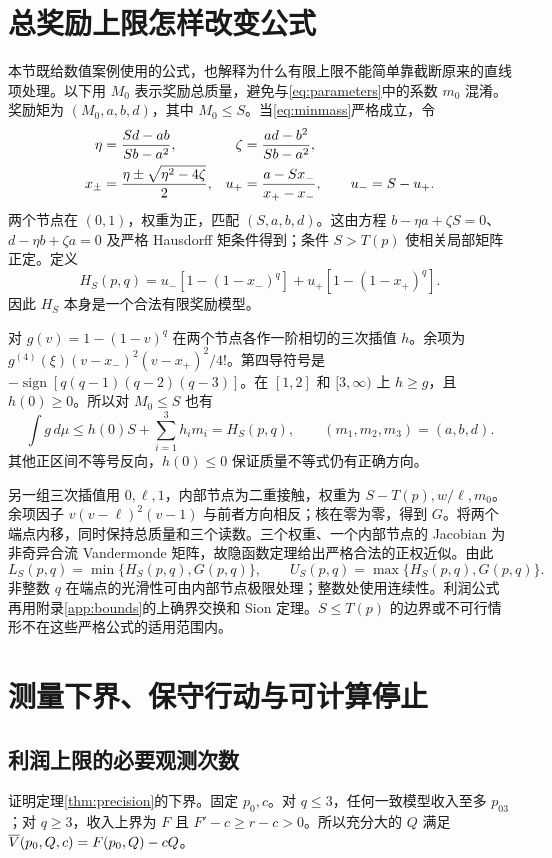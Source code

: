 \section{总奖励上限怎样改变公式}\label{app:cap}
本节既给数值案例使用的公式，也解释为什么有限上限不能简单靠截断原来的直线项处理。以下用 $M_0$ 表示奖励总质量，避免与\eqref{eq:parameters}中的系数 $m_0$ 混淆。奖励矩为 $(M_0,a,b,d)$，其中 $M_0\leq S$。当\eqref{eq:minmass}严格成立，令
\begin{align}
 \eta&=\frac{Sd-ab}{Sb-a^2},&\zeta&=\frac{ad-b^2}{Sb-a^2},\notag\\
 x_\pm&=\frac{\eta\pm\sqrt{\eta^2-4\zeta}}2,&
 u_+&=\frac{a-Sx_-}{x_+-x_-},\qquad u_-=S-u_+.\label{eq:capnodes}
\end{align}
两个节点在 $(0,1)$，权重为正，匹配 $(S,a,b,d)$。这由方程
$b-\eta a+\zeta S=0$、$d-\eta b+\zeta a=0$ 及严格 Hausdorff 矩条件得到；条件 $S>T(p)$ 使相关局部矩阵正定。定义
\begin{equation}\label{eq:HS}
 H_S(p,q)=u_-[1-(1-x_-)^q]+u_+[1-(1-x_+)^q].
\end{equation}
因此 $H_S$ 本身是一个合法有限奖励模型。

对 $g(v)=1-(1-v)^q$ 在两个节点各作一阶相切的三次插值 $h$。余项为
$g^{(4)}(\xi)(v-x_-)^2(v-x_+)^2/4!$。第四导符号是
$-\operatorname{sign}[q(q-1)(q-2)(q-3)]$。在 $[1,2]$ 和 $[3,\infty)$ 上 $h\geq g$，且 $h(0)\geq0$。所以对 $M_0\leq S$ 也有
\[
 \int g\,d\mu\leq h(0)S+\sum_{i=1}^3h_i m_i=H_S(p,q),
 \qquad (m_1,m_2,m_3)=(a,b,d).
\]
其他正区间不等号反向，$h(0)\leq0$ 保证质量不等式仍有正确方向。

另一组三次插值用 $0,\ell,1$，内部节点为二重接触，权重为 $S-T(p),w/\ell,m_0$。余项因子 $v(v-\ell)^2(v-1)$ 与前者方向相反；核在零为零，得到 $G$。将两个端点内移，同时保持总质量和三个读数。三个权重、一个内部节点的 Jacobian 为非奇异合流 Vandermonde 矩阵，故隐函数定理给出严格合法的正权近似。由此
\[
 L_S(p,q)=\min\{H_S(p,q),G(p,q)\},\qquad
 U_S(p,q)=\max\{H_S(p,q),G(p,q)\}.
\]
非整数 $q$ 在端点的光滑性可由内部节点极限处理；整数处使用连续性。利润公式再用附录\ref{app:bounds}的上确界交换和 Sion 定理。$S\leq T(p)$ 的边界或不可行情形不在这些严格公式的适用范围内。

\section{测量下界、保守行动与可计算停止}\label{app:statistics}
\subsection{利润上限的必要观测次数}
证明定理\ref{thm:precision}的下界。固定 $p_0,c$。对 $q\leq3$，任何一致模型收入至多 $p_{03}$；对 $q\geq3$，收入上界为 $F$ 且 $F'-c\geq r-c>0$。所以充分大的 $Q$ 满足 $\overline V(p_0,Q,c)=F(p_0,Q)-cQ$。

